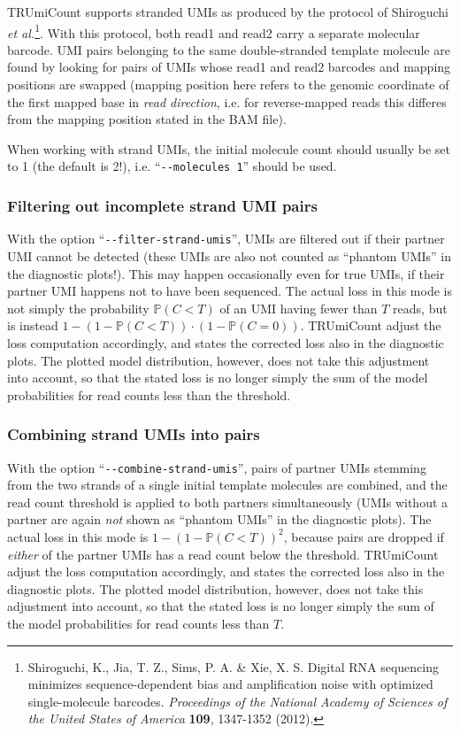 \documentclass{scrartcl}
\newcommand{\ddarg}[1]{\texttt{-{}-#1}}
\begin{document}
TRUmiCount supports stranded UMIs as produced by the protocol of Shiroguchi \textit{et al.}\footnote{Shiroguchi, K., Jia, T. Z., Sims, P. A. \& Xie, X. S. Digital RNA sequencing minimizes sequence-dependent bias and amplification noise with optimized single-molecule barcodes. \textit{Proceedings of the National Academy of Sciences of the United States of America} \textbf{109}, 1347-1352 (2012).}. With this protocol, both read1 and read2 carry a separate molecular barcode. UMI pairs belonging to the same double-stranded template molecule are found by looking for pairs of UMIs whose read1 and read2 barcodes and mapping positions are swapped (mapping position here refers to the genomic coordinate of the first mapped base in \emph{read direction}, i.e. for reverse-mapped reads this differes from the mapping position stated in the BAM file).

When working with strand UMIs, the initial molecule count should usually be set to 1 (the default is 2!), i.e. ``\ddarg{molecules 1}'' should be used.

\subsubsection*{Filtering out incomplete strand UMI pairs}

With the option ``\ddarg{filter-strand-umis}'', UMIs are filtered out if their partner UMI cannot be detected (these UMIs are also not counted as ``phantom UMIs'' in the diagnostic plots!). This may happen occasionally even for true UMIs, if their partner UMI happens not to have been sequenced. The actual loss in this mode is not simply the probability $\mathbb{P}(C < T)$ of an UMI having fewer than $T$ reads, but is instead $1 - (1 - \mathbb{P}(C < T))\cdot (1 - \mathbb{P}(C=0))$. TRUmiCount adjust the loss computation accordingly, and states the corrected loss also in the diagnostic plots. The plotted model distribution, however, does not take this adjustment into account, so that the stated loss is no longer simply the sum of the model probabilities for read counts less than the threshold.

\subsubsection*{Combining strand UMIs into pairs}

With the option ``\ddarg{combine-strand-umis}'', pairs of partner UMIs stemming from the two strands of a single initial template molecules are combined, and the read count threshold is applied to both partners simultaneously (UMIs without a partner are again \emph{not} shown as ``phantom UMIs'' in the diagnostic plots). The actual loss in this mode is $1 - (1-\mathbb{P}(C < T))^2$, because pairs are dropped if \emph{either} of the partner UMIs has a read count below the threshold. TRUmiCount adjust the loss computation accordingly, and states the corrected loss also in the diagnostic plots. The plotted model distribution, however, does not take this adjustment into account, so that the stated loss is no longer simply the sum of the model probabilities for read counts less than $T$.
\end{document}
